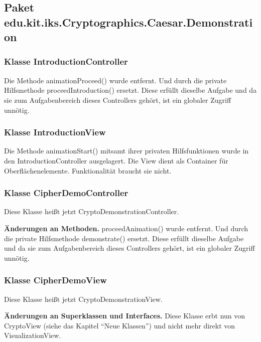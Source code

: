 \documentclass{article}
\begin{document}
 	\subsection{Paket edu.kit.iks.Cryptographics.Caesar.Demonstration}
          
          \subsubsection{Klasse IntroductionController}
            Die Methode animationProceed() wurde entfernt. Und durch die private Hilfsmethode proceedIntroduction() ersetzt.
            Diese erfüllt dieselbe Aufgabe und da sie zum Aufgabenbereich dieses Controllers gehört, ist ein globaler Zugriff
            unnötig.
       	  \subsubsection{Klasse IntroductionView}
            Die Methode animationStart() mitsamt ihrer privaten Hilfsfunktionen wurde in den IntroductionController ausgelagert.
            Die View dient als Container für Oberflächenelemente. Funktionalität braucht sie nicht.
	  \subsubsection{Klasse CipherDemoController}
            Diese Klasse heißt jetzt CryptoDemonstrationController.\newline
         
           \textbf{Änderungen an Methoden.}\newline
            proceedAnimation() wurde entfernt. Und durch die private Hilfsmethode demonstrate() ersetzt.
            Diese erfüllt dieselbe Aufgabe und da sie zum Aufgabenbereich dieses Controllers gehört, 
            ist ein globaler Zugriff unnötig.

	\subsubsection{Klasse CipherDemoView}
	   Diese Klasse heißt jetzt CryptoDemonstrationView.\newline
	   
	    \textbf{Änderungen an Superklassen und Interfaces.}\newline
	     Diese Klasse erbt nun von CryptoView (siehe das Kapitel ``Neue Klassen'') und nicht mehr direkt von VisualizationView.\newline
	   
\end{document}
